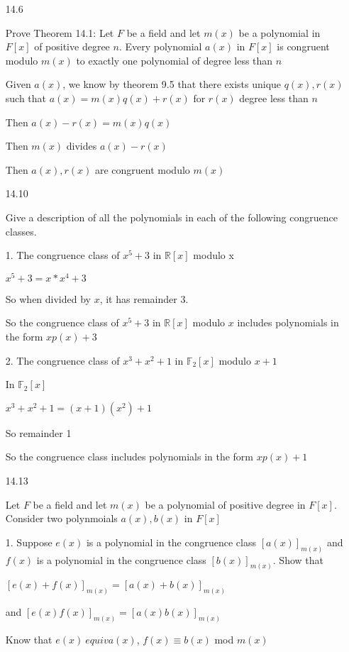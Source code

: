 \documentclass[12pt]{article}
\begin{document}
\begin{itemize}

\newpage 
\item[14.6]

	Prove Theorem 14.1: Let $F$ be a field and let $m(x)$ be a polynomial in $F[x]$ of positive degree $n$. Every polynomial $a(x)$ in $F[x]$ is congruent modulo $m(x)$ to exactly one polynomial of degree less than $n$

	Given $a(x)$, we know by theorem 9.5 that there exists unique $q(x), r(x)$ such that $a(x) = m(x)q(x) + r(x)$ for $r(x)$ degree less than $n$

	Then $a(x) - r(x) = m(x)q(x)$

	Then $m(x)$ divides $a(x)-r(x)$

	Then $a(x), r(x)$ are congruent modulo $m(x)$

\newpage 
\item[14.10]

	Give a description of all the polynomials in each of the following congruence classes.

		1. The congruence class of $x^5 + 3$ in $\mathbb{R}[x]$ modulo x

		$x^5 + 3 = x*x^4 + 3$

		So when divided by $x$, it has remainder 3.

		So the congruence class of $x^5 + 3$ in $\mathbb{R}[x]$ modulo $x$ includes polynomials in the form $xp(x) + 3$

		2. The congruence class of $x^3 + x^2 + 1$ in $\mathbb{F}_2[x]$ modulo $x+1$

		In $\mathbb{F}_2[x]$

		$x^3 + x^2 + 1 = (x+1)(x^2) + 1$

		So remainder 1

		So the congruence class includes polynomials in the form $xp(x) + 1$

\newpage 
\item[14.13]

	Let $F$ be a field and let $m(x)$ be a polynomial of positive degree in $F[x]$. Consider two polynmoials $a(x), b(x)$ in $F[x]$

		1. Suppose $e(x)$ is a polynomial in the congruence class $[a(x)]_{m(x)}$ and $f(x)$ is a polynomial in the congruence class $[b(x)]_{m(x)}$. Show that 

		$[e(x) + f(x)]_{m(x)} = [a(x) + b(x)]_{m(x)}$

		and $[e(x)f(x)]_{m(x)} = [a(x)b(x)]_{m(x)}$

		Know that $e(x) \ equiv a(x)$, $f(x) \equiv b(x)$ mod $m(x)$


\end{itemize}
\end{document}
